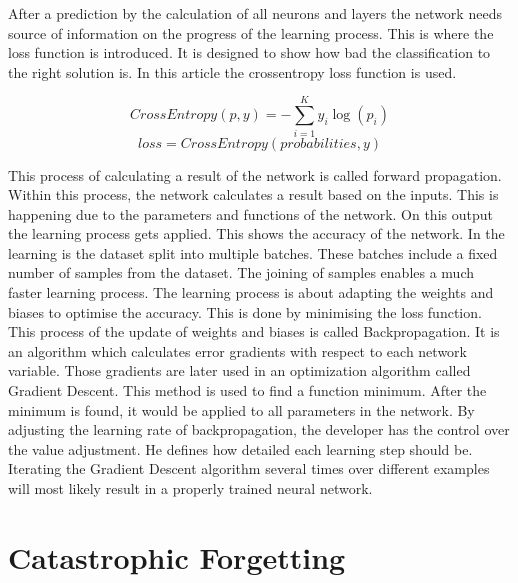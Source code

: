 After a prediction by the calculation of all neurons and layers the network needs source of information on the progress of the learning process.
This is where the loss function is introduced.
It is designed to show how bad the classification to the right solution is.
In this article the crossentropy loss function is used.
\cite{math_nn_skalski, medium_nn_from_scratch}

\begin{equation}
    CrossEntropy(p,y) = -\sum_{i=1}^K y_i \log(p_i)
\end{equation}
\begin{equation}
    loss = CrossEntropy(probabilities, y)
\end{equation}

This process of calculating a result of the network is called forward propagation.
Within this process, the network calculates a result based on the inputs.
This is happening due to the parameters and functions of the network.
On this output the learning process gets applied.
This shows the accuracy of the network.
\cite{math_nn_skalski, medium_nn_from_scratch}
\newline
In the learning is the dataset split into multiple batches. These batches include a fixed number of samples from the dataset. The joining of samples enables a much faster learning process.
The learning process is about adapting the weights and biases to optimise the accuracy.
This is done by minimising the loss function.
This process of the update of weights and biases is called Backpropagation.
It is an algorithm which calculates error gradients with respect to each network variable.
Those gradients are later used in an optimization algorithm called Gradient Descent.
This method is used to find a function minimum.
After the minimum is found, it would be applied to all parameters in the network.
By adjusting the learning rate of backpropagation, the developer has the control over the value adjustment.
He defines how detailed each learning step should be.
\cite{math_nn_andrey}
\newline
Iterating the Gradient Descent algorithm several times over different examples will most likely result in a properly trained neural network.

\section{Catastrophic Forgetting}
\label{catastrophic_forgetting}

